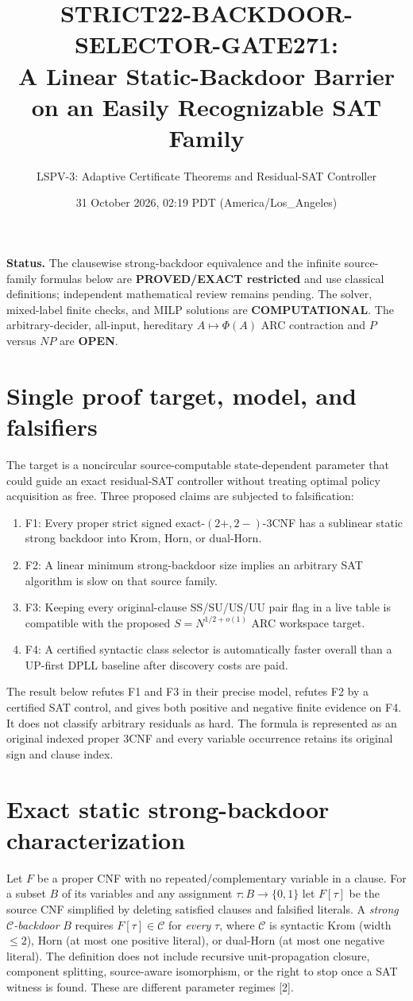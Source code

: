 \documentclass[11pt]{article}
\title{STRICT22-BACKDOOR-SELECTOR-GATE271:\\A Linear Static-Backdoor Barrier on an Easily Recognizable SAT Family}
\author{LSPV-3: Adaptive Certificate Theorems and Residual-SAT Controller}
\date{31 October 2026, 02:19 PDT (America/Los\_Angeles)}
\begin{document}
\maketitle
\noindent\textbf{Status.} The clausewise strong-backdoor equivalence and the infinite source-family formulas below are \textbf{PROVED/EXACT restricted} and use classical definitions; independent mathematical review remains pending. The solver, mixed-label finite checks, and MILP solutions are \textbf{COMPUTATIONAL}. The arbitrary-decider, all-input, hereditary $A\mapsto\Phi(A)$ ARC contraction and $P$ versus $NP$ are \textbf{OPEN}.

\section{Single proof target, model, and falsifiers}
The target is a noncircular source-computable state-dependent parameter that could guide an exact residual-SAT controller without treating optimal policy acquisition as free. Three proposed claims are subjected to falsification:
\begin{enumerate}
\item[] F1: Every proper strict signed exact-$(2+,2-)$-3CNF has a sublinear static strong backdoor into Krom, Horn, or dual-Horn.
\item[] F2: A linear minimum strong-backdoor size implies an arbitrary SAT algorithm is slow on that source family.
\item[] F3: Keeping every original-clause SS/SU/US/UU pair flag in a live table is compatible with the proposed $S=N^{1/2+o(1)}$ ARC workspace target.
\item[] F4: A certified syntactic class selector is automatically faster overall than a UP-first DPLL baseline after discovery costs are paid.
\end{enumerate}
The result below refutes F1 and F3 in their precise model, refutes F2 by a certified SAT control, and gives both positive and negative finite evidence on F4. It does not classify arbitrary residuals as hard. The formula is represented as an original indexed proper 3CNF and every variable occurrence retains its original sign and clause index.

\section{Exact static strong-backdoor characterization}
Let $F$ be a proper CNF with no repeated/complementary variable in a clause. For a subset $B$ of its variables and any assignment $\tau:B\to\{0,1\}$ let $F[\tau]$ be the source CNF simplified by deleting satisfied clauses and falsified literals. A \emph{strong $\mathcal C$-backdoor} $B$ requires $F[\tau]\in\mathcal C$ for \emph{every} $\tau$, where $\mathcal C$ is syntactic Krom (width $\le2$), Horn (at most one positive literal), or dual-Horn (at most one negative literal). The definition does not include recursive unit-propagation closure, component splitting, source-aware isomorphism, or the right to stop once a SAT witness is found. These are different parameter regimes [2].
\end{document}
